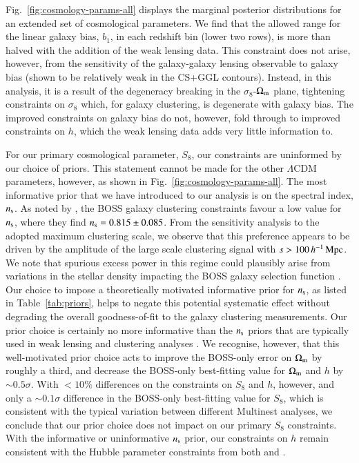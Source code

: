 Fig.~\ref{fig:cosmology-params-all} displays the marginal posterior distributions for an extended set of cosmological parameters.  
We find that the allowed range for the linear galaxy bias,  $b_1$, in each redshift bin (lower two rows), is more than halved with the addition of the weak lensing data. 
This constraint does not arise, however, from the sensitivity of the galaxy-galaxy lensing observable to galaxy bias (shown to be relatively weak in the CS+GGL contours). 
Instead, in this analysis, it is a result of the degeneracy breaking in the $\sigma_8$-$\Omega_{\rm m}$ plane, tightening constraints on $\sigma_8$ which, for galaxy clustering, is degenerate with galaxy bias. 
The improved constraints on galaxy bias do not, however, fold through to improved constraints on $h$, which the weak lensing data adds very little information to. 

For our primary cosmological parameter, $S_8$, our constraints are uninformed by our choice of priors.    This statement cannot be made for the other $\Lambda$CDM parameters, however, as shown in Fig.~\ref{fig:cosmology-params-all}.   The most informative prior that we have introduced to our \tttp analysis is on the spectral index, $n_{\rm s}$.  As noted by \citet{troester/etal:2020}, the BOSS galaxy clustering constraints favour a low value for $n_{\rm s}$, where they find $n_{\rm s} = 0.815 \pm 0.085$. 
From the \citet{troester/etal:2020} sensitivity analysis to the adopted maximum clustering scale, we observe that this preference appears to be driven by the amplitude of the large scale clustering signal with $s > 100 \, h^{-1}\, {\rm Mpc}$.  We note that spurious excess power in this regime could plausibly arise from variations in the stellar density impacting the BOSS galaxy selection function \citep{ross/etal:2017}.  Our choice to impose a theoretically motivated informative prior for $n_{\rm s}$, as listed in Table~\ref{tab:priors}, helps to negate this potential systematic effect without degrading the overall goodness-of-fit to the galaxy clustering measurements.  Our prior choice is certainly no more informative than the $n_{\rm s}$ priors that are typically used in weak lensing and clustering analyses \citep[see for example][]{abbott/etal:2018,eBOSS/etal:2020}. 
We recognise, however, that this well-motivated prior choice acts to improve the BOSS-only error on $\Omega_{\rm m}$ by roughly a third, and decrease the BOSS-only best-fitting value for $\Omega_{\rm m}$ and $h$ by $\sim 0.5\sigma$.  With $<10\%$ differences on the constraints on $S_8$ and $h$, however, and only a $\sim 0.1\sigma$ difference in the BOSS-only best-fitting value for $S_8$, which is consistent with the typical variation between different {\sc Multinest} analyses, we conclude that our prior choice does not impact on our primary $S_8$ constraints.   With the informative or uninformative $n_{\rm s}$ prior, our constraints on $h$ remain consistent with the Hubble parameter constraints from both \citet{planck/etal:2018} and \citet{riess/etal:2019}.

